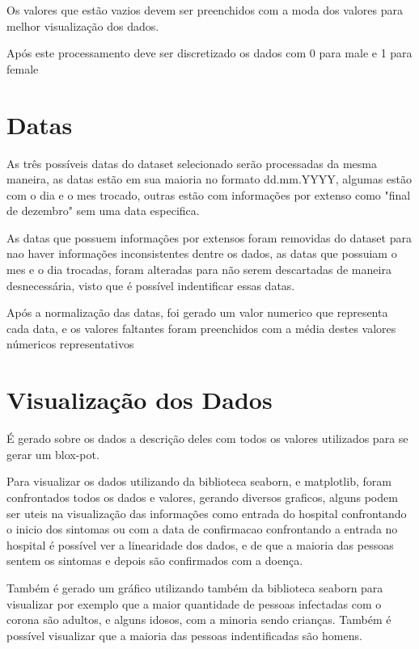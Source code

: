 Os valores que estão vazios devem ser preenchidos com a moda dos valores para melhor visualização dos dados.

Após este processamento deve ser discretizado os dados com 0 para male e 1 para female

\section{Datas}
As três possíveis datas do dataset selecionado serão processadas da mesma maneira, as datas estão em sua maioria no formato dd.mm.YYYY, algumas estão com o dia e o mes trocado, outras estão com informações por extenso como "final de dezembro" sem uma data especifica.

As datas que possuem informações por extensos foram removidas do dataset para nao haver informações inconsistentes dentre os dados, as datas que possuiam o mes e o dia trocadas, foram alteradas para não serem descartadas de maneira desnecessária, visto que é possível indentificar essas datas.

Após a normalização das datas, foi gerado um valor numerico que representa cada data, e os valores faltantes foram preenchidos com a média destes valores númericos representativos

\section{Visualização dos Dados}
É gerado sobre os dados a descrição deles com todos os valores utilizados para se gerar um blox-pot.

Para visualizar os dados utilizando da biblioteca seaborn, e matplotlib, foram confrontados todos os dados e valores, gerando diversos graficos, alguns podem ser uteis na visualização das informações como entrada do hospital confrontando o inicio dos sintomas ou com a data de confirmacao confrontando a entrada no hospital é possível ver a linearidade dos dados, e de que a maioria das pessoas sentem os sintomas e depois são confirmados com a doença.

Também é gerado um gráfico utilizando também da biblioteca seaborn para visualizar por exemplo que a maior quantidade de pessoas infectadas com o corona são adultos, e alguns idosos, com a minoria sendo crianças. Também é possível visualizar que a maioria das pessoas indentificadas são homens.
